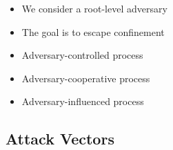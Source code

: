 \begin{inprogress}
  \begin{itemize}
    \item We consider a root-level adversary
    \item The goal is to escape confinement

    \item Adversary-controlled process
    \item Adversary-cooperative process
    \item Adversary-influenced process
  \end{itemize}
\end{inprogress}

\subsection{Attack Vectors}

